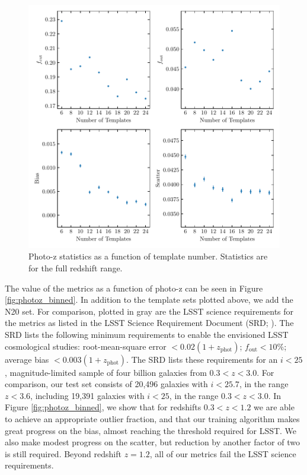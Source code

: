 \documentclass[twocolumn]{aastex63}
\begin{document}
    \begin{figure}
        \centering
        \includegraphics{Ntemplates.pdf}
        \caption{Photo-z statistics as a function of template number. Statistics are for the full redshift range.}
        \label{fig:Ntemplates}
    \end{figure}

    The value of the metrics as a function of photo-z can be seen in Figure \ref{fig:photoz_binned}.
    In addition to the template sets plotted above, we add the N20 set.
    For comparison, plotted in gray are the LSST science requirements for the metrics as listed in the LSST Science Requirement Document (SRD; \citealt{Ivezic2018}).
    The SRD lists the following minimum requirements to enable the envisioned LSST cosmological studies: root-mean-square error $< 0.02(1+z_\text{phot})$; $f_\text{out} < 10\%$; average bias $<0.003(1+z_\text{phot})$.
    The SRD lists these requirements for an $i<25$, magnitude-limited sample of four billion galaxies from $0.3 < z < 3.0$.
    For comparison, our test set consists of 20,496 galaxies with $i < 25.7$, in the range $z < 3.6$, including 19,391 galaxies with $i < 25$, in the range $0.3 < z < 3.0$.
    In Figure \ref{fig:photoz_binned}, we show that for redshifts $0.3 < z < 1.2$ we are able to achieve an appropriate outlier fraction, and that our training algorithm makes great progress on the bias, almost reaching the threshold required for LSST.
    We also make modest progress on the scatter, but reduction by another factor of two is still required.
    Beyond redshift $z=1.2$, all of our metrics fail the LSST science requirements.
\end{document}
